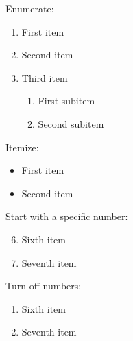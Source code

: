 \documentclass[12pt,a4paper]{article}
\begin{document}
Enumerate:

\begin{enumerate}
\item First item
\item Second item
\item Third item
  \begin{enumerate}
    \item First subitem
    \item Second subitem
  \end{enumerate}
\end{enumerate}

Itemize:

\begin{itemize}
\item First item
\item Second item
\end{itemize}

Start with a specific number:
\begin{enumerate} \setcounter{enumi}{5}
\item Sixth item
\item Seventh item
\end{enumerate}

Turn off numbers:
\begin{enumerate}
\item[] Sixth item
\item[] Seventh item
\end{enumerate}
\end{document}
